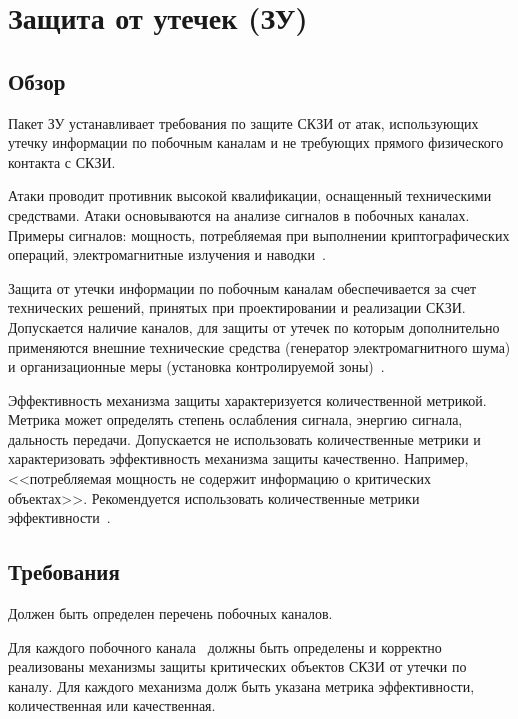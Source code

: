 \section{Защита от утечек (ЗУ)}\label{NI}

\subsection{Обзор}\label{NI.Intro}

Пакет ЗУ устанавливает требования по защите СКЗИ от атак, использующих утечку
информации по побочным каналам и не требующих прямого физического контакта с
СКЗИ.

Атаки проводит противник высокой квалификации, оснащенный 
техническими средствами. 
%
Атаки основываются на анализе сигналов в побочных каналах.
%
Примеры сигналов: мощность, потребляемая при выполнении криптографических
операций, электромагнитные излучения и наводки~.

Защита от утечки информации по побочным каналам обеспечивается за счет
технических решений, принятых при проектировании и реализации СКЗИ. Допускается
наличие каналов, для защиты от утечек по которым дополнительно применяются
внешние технические средства (генератор электромагнитного шума) и
организационные меры (установка контролируемой
зоны)~.

Эффективность механизма защиты характеризуется количественной метрикой.
Метрика может определять степень ослабления сигнала, энергию сигнала, 
дальность передачи.
%
Допускается не использовать количественные метрики и характеризовать
эффективность механизма защиты качественно. Например, <<потребляемая мощность не
содержит информацию о критических объектах>>.
%
Рекомендуется использовать количественные метрики
эффективности~.

\subsection{Требования}\label{NI.Reqs}


\label{R.NI.Channels} %
Должен быть определен перечень побочных каналов. 


\label{R.NI.Protect} %
Для каждого побочного канала~
должны быть определены и корректно реализованы механизмы защиты 
критических объектов СКЗИ от утечки по каналу. 
%
Для каждого механизма долж быть указана метрика эффективности,
количественная или качественная.

